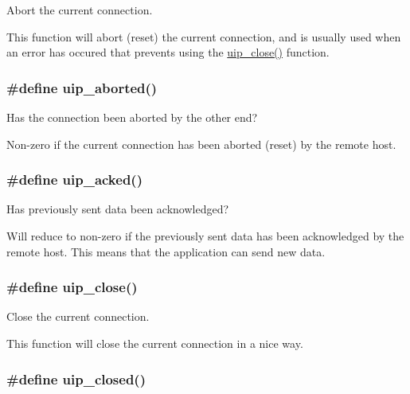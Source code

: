 Abort the current connection. 

This function will abort (reset) the current connection, and is usually used when an error has occured that prevents using the \hyperlink{a00064_g61db1dcb7c760e4dd5d60bf4e5576dca}{uip\_\-close()} function. \hypertarget{a00064_gfbd5fc486dfdf6bf6fc9db52b1f418c4}{
\subsubsection[uip\_\-aborted]{\setlength{\rightskip}{0pt plus 5cm}\#define uip\_\-aborted()}}
\label{a00064_gfbd5fc486dfdf6bf6fc9db52b1f418c4}


Has the connection been aborted by the other end? 

Non-zero if the current connection has been aborted (reset) by the remote host. \hypertarget{a00064_gde6634974418e3240c212b9b16864368}{
\subsubsection[uip\_\-acked]{\setlength{\rightskip}{0pt plus 5cm}\#define uip\_\-acked()}}
\label{a00064_gde6634974418e3240c212b9b16864368}


Has previously sent data been acknowledged? 

Will reduce to non-zero if the previously sent data has been acknowledged by the remote host. This means that the application can send new data. \hypertarget{a00064_g61db1dcb7c760e4dd5d60bf4e5576dca}{
\subsubsection[uip\_\-close]{\setlength{\rightskip}{0pt plus 5cm}\#define uip\_\-close()}}
\label{a00064_g61db1dcb7c760e4dd5d60bf4e5576dca}


Close the current connection. 

This function will close the current connection in a nice way. \hypertarget{a00064_gef6c4140c632b6a406779342cf3b6eb6}{
\subsubsection[uip\_\-closed]{\setlength{\rightskip}{0pt plus 5cm}\#define uip\_\-closed()}}
\label{a00064_gef6c4140c632b6a406779342cf3b6eb6}


